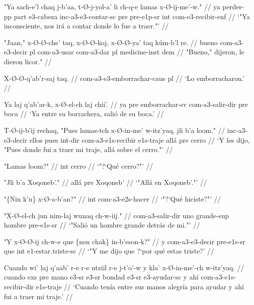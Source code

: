 \documentclass[12pt]{article}
\begin{document}
\ex
\begingl
  \gla  "Ya sach-e'l chaq j-b'aa, t-\O-j-yol-a' li ch-q-e lamas x-\O-ij-me'-w." //
  \glb  ya perder-pp part e3-cabeza inc-a3-e3-contar-sc pre pre-e1p-sr int com-e3-recibir-enf //
  \glft `"Ya inconsciente, nos ir\'a a contar donde lo fue a traer."' //
\endgl
\xe

\ex
\begingl
  \gla  "Jaan," x-\O-\O-che' taq, x-\O-\O-koj, x-\O-\O-ya' taq k\'um-b'l re. //
  \glb bueno com-a3-e3-decir pl com-a3-usar com-a3-dar pl medicine-inst dem  //
  \glft "Bueno," dijeron, le dieron licor." //
\endgl
\xe

\ex
\begingl
  \gla  X-\O-\O-q'ab'r-saj taq. //
  \glb com-a3-e3-emborrachar-caus pl  //
  \glft `Lo emborracharon.' //
\endgl
\xe


\ex
\begingl
  \gla  Ya laj q'ab'ar-k, x-\O-el-ch laj chii'. //
  \glb ya pre emborrachar-sv com-a3-salir-dir pre boca //
  \glft `Ya entre su borrachera, sali\'o de su boca.' //
\endgl
\xe

\ex
\begingl
  \gla  T-\O-ij-b'ij rechaq, "Pues lamas-tch x-\O-in-me' w-itz'yaq, jli b'a loom." //
  \glb inc-a3-e3-decir ellos pues int-dir com-a3-e1s-recibir e1s-traje all\'a pre cerro //
  \glft `Y les dijo, "Pues donde fui a traer mi traje, all\'a sobre el cerro."' //
\endgl
\xe

\ex
\begingl
  \gla  "Lamas loom?" //
  \glb int cerro //
  \glft `"?`Qu\'e cerro?"' //
\endgl
\xe

\ex
\begingl
  \gla  "Jli b'a Xoqoneb'." //
  \glb  all\'a pre Xoqoneb' //
  \glft `"All\'a en Xoqoneb'."' //
\endgl
\xe

\ex
\begingl
  \gla  "\{Nin k'u\} x-\O-a-b'an?" //
  \glb  int com-a3-e2s-hacer //
  \glft `"?`Qu\'e hiciste?"' //
\endgl
\xe

\ex
\begingl
  \gla "X-\O-el-ch jun nim-laj wunaq ch-w-iij." //
  \glb com-a3-salir-dir uno grande-sup hombre pre-e1s-sr //
  \glft `"Sali\'o un hombre grande detr\'as de mi."' //
\endgl
\xe


\ex
\begingl
  \gla  "Y x-\O-\O-ij ch-w-e que \{nen chak\} in-b'eson-k?" //
  \glb  y com-a3-e3-decir pre-e1s-sr que int e1-estar.triste-sc  //
  \glft `"Y me dijo que ?`por qu\'e estas triste?' //
\endgl
\xe

\ex
\begingl
  \gla  Cuando wi' laj q'aab' r-e r-e utziil r-e j-t'o'-w y kla' x-\O-in-me'-ch w-itz'yaq. //
  \glb  cuando exs pre mano e3-sr e3-sr bondad e3-sr e3-ayudar-sc y ah\'i com-a3-e1s-recibir-dir e1s-traje //
  \glft `Cuando ten\'ia entre sus manos alegr\'ia para ayudar y ah\'i fui a traer mi traje.' //
\endgl
\xe
\end{document}
